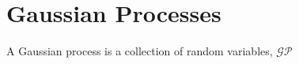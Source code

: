 \chapter{Gaussian Processes}
\label{ch:4}
A Gaussian process is a collection of random variables,
$\mathcal{GP}$